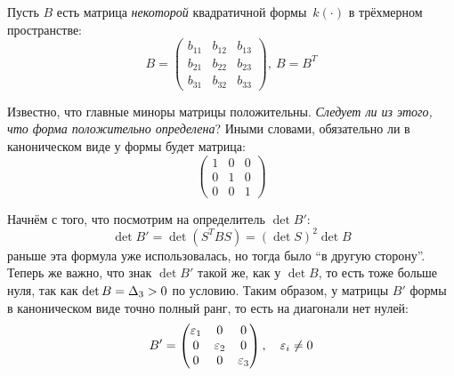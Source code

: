 \documentclass[a4paper,12pt]{article}
\begin{document}
  \begin{example}
    Пусть $B$ есть матрица \emph{некоторой} квадратичной формы~$k(\cdot)$ в трёхмерном пространстве:
    \[
      B = \begin{pmatrix}
        b_{11} & b_{12} & b_{13}\\
        b_{21} & b_{22} & b_{23}\\
        b_{31} & b_{32} & b_{33}
      \end{pmatrix},\ B = B^T
    \]
    
    Известно, что главные миноры матрицы положительны.
    \emph{Следует ли из этого, что форма положительно определена}?
    Иными словами, обязательно ли в каноническом виде у формы будет матрица:
    \[
      \begin{pmatrix}
        1 & 0 & 0\\
        0 & 1 & 0\\
        0 & 0 & 1
      \end{pmatrix}
    \]
    
    Начнём с того, что посмотрим на определитель $\det B'$:
    \[
      \det B' = \det (S^T B S) = (\det S)^2 \det B
    \]
    раньше эта формула уже использовалась, но тогда было ``в другую сторону''.
    Теперь же важно, что знак $\det B'$ такой же, как у $\det B$, то есть тоже больше нуля, так как $\det B \hm= \Delta_3 \hm> 0$ по условию.
    Таким образом, у матрицы $B'$ формы в каноническом виде точно полный ранг, то есть на диагонали нет нулей:
    \[
      B' = \begin{pmatrix}
        \varepsilon_1 & 0      & 0\\
        0      & \varepsilon_2 & 0\\
        0      & 0      & \varepsilon_3
      \end{pmatrix},\quad \varepsilon_i \not= 0
    \]
    

\end{example}
\end{document}
